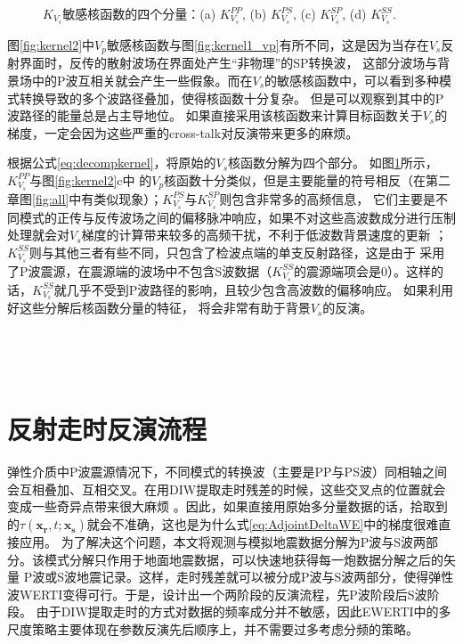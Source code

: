 \begin{figure}[!bth]
   \caption{$K_{V_s}$敏感核函数的四个分量：(a) $K_{V_s}^{PP}$, (b) $K_{V_s}^{PS}$, (c) $K_{V_s}^{SP}$, (d) $K_{V_s}^{SS}$.}
   \label{fig:kernel2_vs_decomp}
\end{figure}
图\ref{fig:kernel2}中$V_p$敏感核函数与图\ref{fig:kernel1_vp}有所不同，这是因为当存在$V_s$反射界面时，反传的散射波场在界面处产生“非物理”的SP转换波，
这部分波场与背景场中的P波互相关就会产生一些假象。而在$V_s$的敏感核函数中，可以看到多种模式转换导致的多个波路径叠加，使得核函数十分复杂。
但是可以观察到其中的P波路径的能量总是占主导地位。
如果直接采用该核函数来计算目标函数关于$V_s$的梯度，一定会因为这些严重的cross-talk对反演带来更多的麻烦。

根据公式\eqref{eq:decompkernel}，将原始的$V_s$核函数分解为四个部分。
如图\ref{fig:kernel2_vs_decomp}所示，$K_{V_s}^{PP}$与图\ref{fig:kernel2}c中
的$V_p$核函数十分类似，但是主要能量的符号相反（在第二章图\ref{fig:all}中有类似现象）；$K_{V_s}^{PS}$与$K_{V_s}^{SP}$则包含非常多的高频信息，
它们主要是不同模式的正传与反传波场之间的偏移脉冲响应，如果不对这些高波数成分进行压制处理就会对$V_s$梯度的计算带来较多的高频干扰，不利于低波数背景速度的更新
；$K_{V_s}^{SS}$则与其他三者有些不同，只包含了检波点端的单支反射路径，这是由于
采用了P波震源，在震源端的波场中不包含S波数据（$K_{V_s}^{SS}$的震源端项会是0）。这样的话，$K_{V_s}^{SS}$就几乎不受到P波路径的影响，且较少包含高波数的偏移响应。
如果利用好这些分解后核函数分量的特征，
将会非常有助于背景$V_s$的反演。

$\quad$

$\quad$
\section{反射走时反演流程}
弹性介质中P波震源情况下，不同模式的转换波（主要是PP与PS波）同相轴之间会互相叠加、互相交叉。在用DIW提取走时残差的时候，这些交叉点的位置就会变成一些奇异点带来很大麻烦
。因此，如果直接用原始多分量数据的话，拾取到的$\tau(\mathbf{x_r},t;\mathbf{x_s})$就会不准确，这也是为什么式\eqref{eq:AdjointDeltaWE}中的梯度很难直接应用。
为了解决这个问题，本文将观测与模拟地震数据分解为P波与S波两部分。该模式分解只作用于地面地震数据\cite[]{Li2016a}，可以快速地获得每一炮数据分解之后的矢量
P波或S波地震记录。这样，走时残差就可以被分成P波与S波两部分，使得弹性波WERTI变得可行。于是，设计出一个两阶段的反演流程，先P波阶段后S波阶段。
由于DIW提取走时的方式对数据的频率成分并不敏感，因此EWERTI中的多尺度策略主要体现在参数反演先后顺序上，并不需要过多考虑分频的策略。
